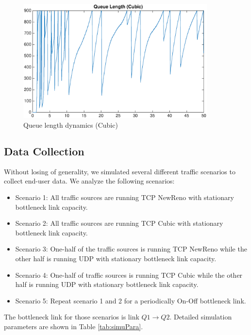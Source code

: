 \begin{figure}
\centering
\includegraphics[width=10cm]{QueueLengthCubic.eps}
\caption{Queue length dynamics (Cubic)}
\label{queuelengthCubic}
\end{figure}


\subsection{Data Collection}
Without losing of generality, we simulated several different traffic scenarios to collect end-user data. We analyze the following scenarios: 
\begin{itemize}
    \item Scenario 1: All traffic sources are running TCP NewReno with stationary bottleneck link capacity.
    \item Scenario 2: All traffic sources are running TCP Cubic with stationary bottleneck link capacity.
    \item Scenario 3: One-half of the traffic sources is running TCP NewReno while the other half is running UDP with stationary bottleneck link capacity.
    \item Scenario 4: One-half of traffic sources is running TCP Cubic while the other half is running UDP with stationary bottleneck link capacity.
    \item Scenario 5: Repeat scenario 1 and 2 for a periodically On-Off bottleneck link.
\end{itemize}
The bottleneck link for those scenarios is link $Q1 \to Q2$. Detailed simulation parameters are shown in Table \ref{tab:simuPara}.

